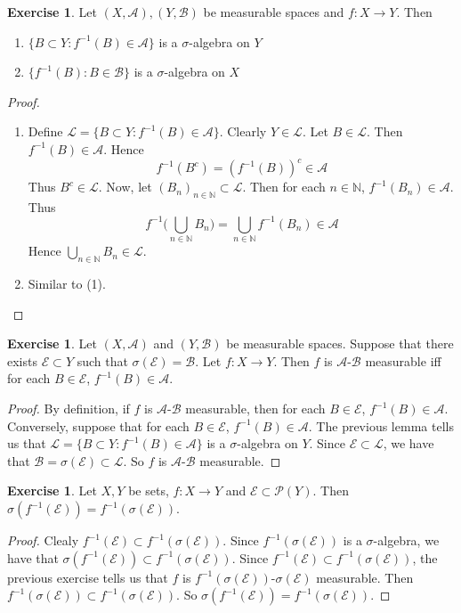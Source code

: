 \documentclass[12pt]{amsart}
\theoremstyle{definition}
\newtheorem{ex}[definition]{Exercise}
\newcommand{\sig}{\sigma}
\newcommand{\N}{\mathbb{N}}
\newcommand{\MA}{\mathcal{A}}
\newcommand{\MB}{\mathcal{B}}
\newcommand{\ML}{\mathcal{L}}
\newcommand{\MP}{\mathcal{P}}
\newcommand{\ME}{\mathcal{E}}
\begin{document}
	\begin{ex}
		Let $(X,\MA), (Y,\MB)$ be measurable spaces and $f: X \rightarrow Y$. Then 
		\begin{enumerate}
			\item $\{B \subset Y: f^{-1}(B) \in \MA\}$ is a $\sig$-algebra on $Y$
			\item $\{f^{-1}(B): B \in \MB\}$ is a $\sig$-algebra on $X$
		\end{enumerate}
	\end{ex}
	
	\begin{proof}\
		\begin{enumerate}
			\item Define $\ML = \{B \subset Y: f^{-1}(B) \in \MA\}$.  Clearly $Y \in \ML$. Let $B \in \ML$. Then $f^{-1}(B) \in \MA$. Hence $$f^{-1}(B^c) = (f^{-1}(B))^c \in \MA$$ Thus $B^c \in \ML$. Now, let $(B_n)_{n \in \N} \subset \ML$. Then for each $n \in \N$, $f^{-1}(B_n) \in \MA$. Thus $$f^{-1}\bigg(\bigcup_{n \in \N} B_n \bigg) = \bigcup_{n \in \N} f^{-1}(B_n) \in \MA$$ Hence $\bigcup\limits_{n \in \N} B_n \in \ML$.
			\item Similar to (1).
		\end{enumerate}
	\end{proof}
	
	\begin{ex}
		Let $(X,\MA)$ and $(Y, \MB)$ be measurable spaces. Suppose that there exists $\ME \subset Y$ such that $\sig(\ME) = \MB$. Let $f:X \rightarrow Y$. Then $f$ is $\MA$-$\MB$ measurable iff for each $B \in \ME$, $f^{-1}(B) \in \MA$.
	\end{ex}
	
	\begin{proof}
		By definition, if $f$ is $\MA$-$\MB$ measurable, then for each $B \in \ME$, $f^{-1}(B) \in \MA$. Conversely, suppose that for each $B \in \ME$, $f^{-1}(B) \in \MA$. The previous lemma tells us that $\ML = \{B \subset Y: f^{-1}(B) \in \MA\}$ is a $\sig$-algebra on $Y$. Since $\ME \subset \ML$, we have that $\MB = \sig(\ME) \subset \ML$. So $f$ is $\MA$-$\MB$ measurable.
	\end{proof}
	
	\begin{ex}
		Let $X,Y$ be sets, $f:X \rightarrow Y$ and $\ME \subset \MP(Y)$. Then $\sig(f^{-1}(\ME)) = f^{-1}(\sig(\ME))$. 
	\end{ex}
	
	\begin{proof}
		Clealy $f^{-1}(\ME) \subset f^{-1}(\sig(\ME))$. Since $f^{-1}(\sig(\ME))$ is a $\sig$-algebra, we have that $\sig(f^{-1}(\ME)) \subset f^{-1}(\sig(\ME))$. Since $f^{-1}(\ME) \subset f^{-1}(\sig(\ME))$, the previous exercise tells us that $f$ is $f^{-1}(\sig(\ME))$-$\sig(\ME)$ measurable. Then $f^{-1}(\sig(\ME)) \subset f^{-1}(\sig(\ME))$. So $\sig(f^{-1}(\ME)) = f^{-1}(\sig(\ME))$.  
	\end{proof}
	
\end{document}
